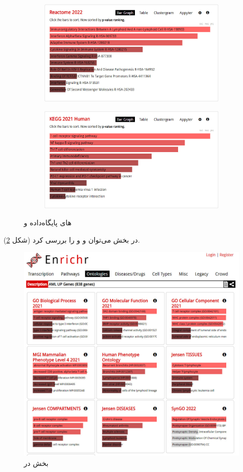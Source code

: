 \documentclass{article}
\begin{document}
\begin{figure}[h!]
	\begin{subfigure}{.5\columnwidth}
		\centering
		\includegraphics[width=\columnwidth]{figs/enrichr-pathways-reactome-2.jpg}
	\end{subfigure}
	\begin{subfigure}{.5\columnwidth}
		\centering
		\includegraphics[width=\columnwidth]{figs/enrichr-pathways-kegg-2.jpg}
	\end{subfigure}
	\caption{های پایگاه‌داده  و }
	\label{fig:enrichr-pathways-reactome-kegg}
\end{figure}

در بخش  می‌توان  و  و  را بررسی کرد (شکل \ref{fig:enrichr-ontology-2}).
\begin{figure}[h!]
	\centering
	\includegraphics[width=0.5\columnwidth]{figs/enrichr-ontologies-2.jpg}
	\caption{بخش  در }
	\label{fig:enrichr-ontology-2}
\end{figure}
\end{document}
